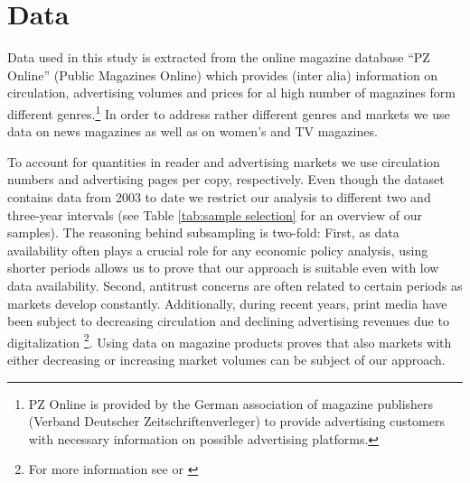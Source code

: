 \documentclass[12pt,a4paper,notitlepage]{article}
\begin{document}
\section{Data}\label{sec:data}

Data used in this study is extracted from the online magazine database ``PZ Online'' (Public Magazines Online) which provides (inter alia) information on circulation, advertising volumes and prices for al high number of magazines form different genres.\footnote{PZ Online is provided by the German association of magazine publishers (Verband Deutscher Zeitschriftenverleger) to provide advertising customers with necessary information on possible advertising platforms.} In order to address rather different genres and markets we use data on news magazines as well as on women's and TV magazines. 

To account for quantities in reader and advertising markets we use circulation numbers and advertising pages per copy, respectively. 
Even though the dataset contains data from 2003 to date we restrict our analysis to different two and three-year intervals (see Table \ref{tab:sample selection} for an overview of our samples). The reasoning behind subsampling is two-fold: First, as data availability often plays a crucial role for any economic policy analysis, using shorter periods allows us to prove that our approach is suitable even with low data availability. 
Second, antitrust concerns are often related to certain periods as markets develop constantly. Additionally, during recent years, print media have been subject to decreasing circulation and declining advertising revenues due to digitalization \footnote{For more information see \cite{cabyova_impact_2014} or \cite{picard_digitization_2011}}. Using data on magazine products proves that also markets with either decreasing or increasing market volumes can be subject of our approach.
\end{document}
